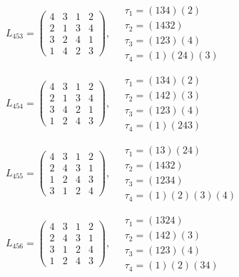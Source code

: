$L_{453} = \begin{pmatrix} 4 & 3 & 1 & 2 \\ 2 & 1 & 3 & 4 \\ 3 & 2 & 4 & 1 \\ 1 & 4 & 2 & 3 \end{pmatrix}, \quad \begin{matrix} \tau_{1} = (1 3 4)(2) \\ \tau_{2} = (1 4 3 2) \\ \tau_{3} = (1 2 3)(4) \\ \tau_{4} = (1)(2 4)(3) \end{matrix}$

$L_{454} = \begin{pmatrix} 4 & 3 & 1 & 2 \\ 2 & 1 & 3 & 4 \\ 3 & 4 & 2 & 1 \\ 1 & 2 & 4 & 3 \end{pmatrix}, \quad \begin{matrix} \tau_{1} = (1 3 4)(2) \\ \tau_{2} = (1 4 2)(3) \\ \tau_{3} = (1 2 3)(4) \\ \tau_{4} = (1)(2 4 3) \end{matrix}$

$L_{455} = \begin{pmatrix} 4 & 3 & 1 & 2 \\ 2 & 4 & 3 & 1 \\ 1 & 2 & 4 & 3 \\ 3 & 1 & 2 & 4 \end{pmatrix}, \quad \begin{matrix} \tau_{1} = (1 3)(2 4) \\ \tau_{2} = (1 4 3 2) \\ \tau_{3} = (1 2 3 4) \\ \tau_{4} = (1)(2)(3)(4) \end{matrix}$

$L_{456} = \begin{pmatrix} 4 & 3 & 1 & 2 \\ 2 & 4 & 3 & 1 \\ 3 & 1 & 2 & 4 \\ 1 & 2 & 4 & 3 \end{pmatrix}, \quad \begin{matrix} \tau_{1} = (1 3 2 4) \\ \tau_{2} = (1 4 2)(3) \\ \tau_{3} = (1 2 3)(4) \\ \tau_{4} = (1)(2)(3 4) \end{matrix}$

